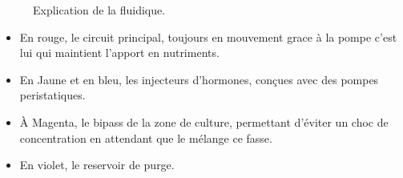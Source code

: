 \documentclass[a4paper, 11pt]{article}
\begin{document}
\begin{figure}[H]
    \centering
    \caption{Explication de la fluidique.}
    \label{fig:Maquette_flu}
\end{figure}
\begin{itemize}
    \item En rouge, le circuit principal, toujours en mouvement grace à la pompe c'est lui qui maintient l'apport en nutriments.
    \item En Jaune et en bleu, les injecteurs d'hormones, conçues avec des pompes peristatiques.
    \item À Magenta, le bipass de la zone de culture, permettant d'éviter un choc de concentration en attendant que le mélange ce fasse.
    \item En violet, le reservoir de purge.
\end{itemize}
\newpage
\end{document}
